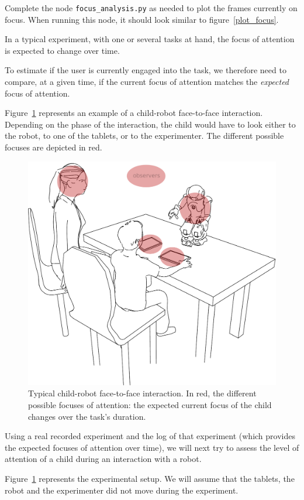 \documentclass{instructions}
\begin{document}
Complete the node {\tt focus\_analysis.py} as needed to plot the frames currently
on focus. When running this node, it should look similar to figure~\ref{plot_focus}.



In a typical experiment, with one or several tasks at hand, the focus of
attention is expected to change over time.

To estimate if the user is currently engaged into the task, we therefore need to
compare, at a given time, if the current focus of attention matches the {\it
expected} focus of attention.

Figure~\ref{focuses} represents an example of a child-robot face-to-face
interaction. Depending on the phase of the interaction, the child would have to
look either to the robot, to one of the tablets, or to the experimenter. The
different possible focuses are depicted in red.

\begin{figure}
    \centering
    \includegraphics[width=0.7\linewidth]{figs/cowriter_setup}
    \caption{Typical child-robot face-to-face interaction. In red, the different
    possible focuses of attention: the expected current focus of the child
    changes over the task's duration.}
    \label{focuses}
\end{figure}

Using a real recorded experiment and the log of that experiment (which provides
the expected focuses of attention over time), we will next try to assess the
level of attention of a child during an interaction with a robot.

Figure~\ref{focuses} represents the experimental setup. We will assume that the
tablets, the robot and the experimenter did not move during the experiment.
\end{document}
